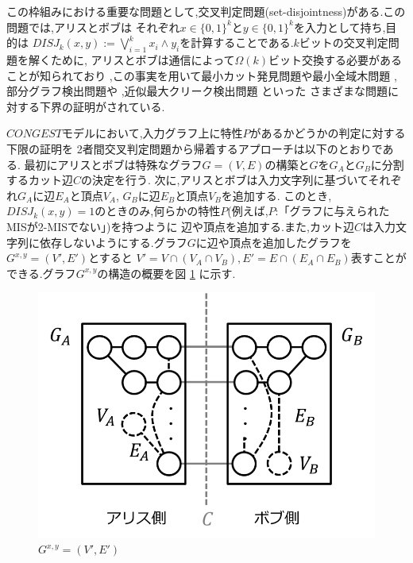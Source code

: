 \documentclass[12pt]{thesis}
\theoremstyle{definition}
\begin{document}
この枠組みにおける重要な問題として,交叉判定問題(set-disjointness)がある.この問題では,アリスとボブは
それぞれ$x \in \{0, 1\}^{k}$と$y \in \{0, 1\}^{k}$を入力として持ち,目的は
$DISJ_{k} (x, y) :=\bigvee_{i = 1}^{k} x_{i} \land y_{i}$を計算することである.$k$ビットの交叉判定問題を解くために,
アリスとボブは通信によって$\Omega (k)$ビット交換する必要があることが知られており 
\cite{kalyanasundaram1992probabilistic},この事実を用いて最小カット発見問題や最小全域木問題 \cite{sarma2012distributed}, 
部分グラフ検出問題や \cite{fischer2018possibilities} ,近似最大クリーク検出問題 \cite{czumaj2020detecting} といった
さまざまな問題に対する下界の証明がされている.

$CONGEST$モデルにおいて,入力グラフ上に特性$P$があるかどうかの判定に対する下限の証明を
2者間交叉判定問題から帰着するアプローチは以下のとおりである.
最初にアリスとボブは特殊なグラフ$G = (V, E)$の構築と$G$を$G_{A}$と$G_{B}$に分割するカット辺$C$の決定を行う.
次に,アリスとボブは入力文字列に基づいてそれぞれ$G_{A}$に辺$E_{A}$と頂点$V_{A}$,
$G_{B}$に辺$E_{B}$と頂点$V_{B}$を追加する.
このとき,$DISJ_{k} (x, y)=1$のときのみ,何らかの特性$P$(例えば,$P$:「グラフに与えられたMISが2-MISでない」)を持つように
辺や頂点を追加する.また,カット辺$C$は入力文字列に依存しないようにする.グラフ$G$に辺や頂点を追加したグラフを
$G^{x, y} = (V', E')$とすると
$V' = V \cap (V_{A} \cap V_{B}), E' = E \cap (E_{A} \cap E_{B})$表すことができる.グラフ$G^{x, y}$の構造の概要を図 \ref{Gxy} に示す.
\begin{figure}[ht]
\begin{center}
\includegraphics[width=120mm]{Gxy.png}
\end{center}
\caption{$G^{x, y} = (V', E')$}
\label{Gxy}
\end{figure}
\end{document}
